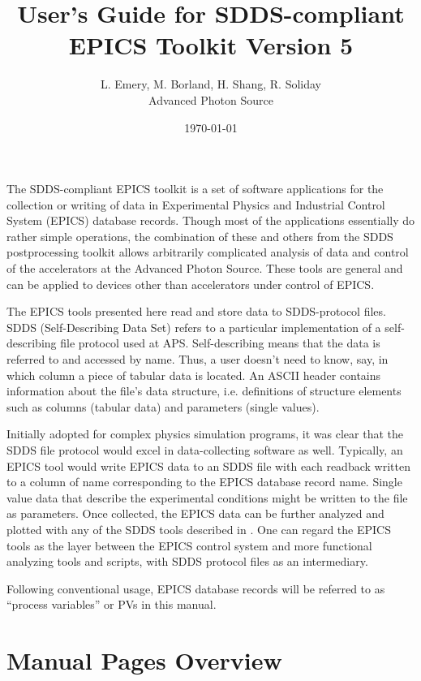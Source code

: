 \documentclass[11pt]{article}
\begin{document}
\title{User's Guide for SDDS-compliant EPICS Toolkit Version 5}
\author{L. Emery, M. Borland, H. Shang, R. Soliday\\Advanced Photon Source\\ \date{\today}}
\maketitle

The SDDS-compliant EPICS toolkit is a set of software applications for
the collection or writing of data in Experimental Physics and
Industrial Control System (EPICS) database records.  Though most of
the applications essentially do rather simple operations, the
combination of these and others from the SDDS postprocessing toolkit
allows arbitrarily complicated analysis of data and control of the
accelerators at the Advanced Photon Source. These tools are general
and can be applied to devices other than accelerators under control of
EPICS.

The EPICS tools presented here read and store data to SDDS-protocol
files.  SDDS (Self-Describing Data Set)\cite{SDDS_AP1.4} refers to a
particular implementation of a self-describing file protocol used at
APS. Self-describing means that the data is referred to and accessed by
name. Thus, a user doesn't need to know, say, in which column a piece
of tabular data is located. An ASCII header contains information about the
file's data structure, i.e. definitions of structure elements
such as columns (tabular data) and parameters (single values). 

Initially adopted for complex physics simulation programs, it was clear
that the SDDS file protocol would excel in data-collecting software as
well. Typically, an EPICS tool would write EPICS data to an SDDS file with 
each readback written to a column of name corresponding to the 
EPICS database record name. Single value data that describe the experimental conditions
might be written to the file as parameters.
Once collected, the EPICS data can be further analyzed and plotted
with any of the SDDS tools described in \cite{SDDS_AP1.4}.
One can regard the EPICS tools as the layer between the EPICS
control system and more functional analyzing tools and scripts, with
SDDS protocol files as an intermediary.

Following conventional usage, EPICS database records will be referred
to as ``process variables'' or PVs in this manual.

\section{Manual Pages Overview}
\end{document}
